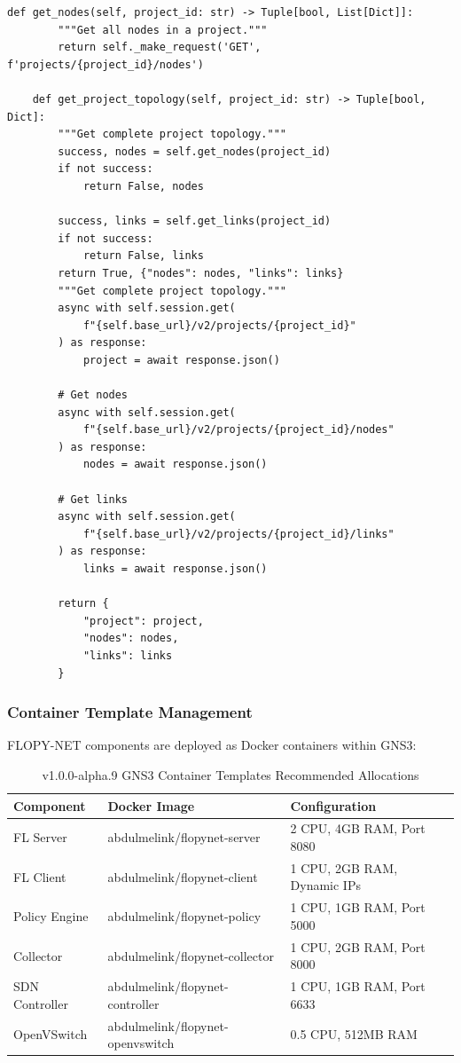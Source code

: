 \begin{lstlisting}[style=pythoncode, caption=GNS3 Integration Client]
    def get_nodes(self, project_id: str) -> Tuple[bool, List[Dict]]:
        """Get all nodes in a project."""
        return self._make_request('GET', f'projects/{project_id}/nodes')
    
    def get_project_topology(self, project_id: str) -> Tuple[bool, Dict]:
        """Get complete project topology."""
        success, nodes = self.get_nodes(project_id)
        if not success:
            return False, nodes
        
        success, links = self.get_links(project_id)
        if not success:
            return False, links        
        return True, {"nodes": nodes, "links": links}
        """Get complete project topology."""
        async with self.session.get(
            f"{self.base_url}/v2/projects/{project_id}"
        ) as response:
            project = await response.json()
        
        # Get nodes
        async with self.session.get(
            f"{self.base_url}/v2/projects/{project_id}/nodes"
        ) as response:
            nodes = await response.json()
        
        # Get links
        async with self.session.get(
            f"{self.base_url}/v2/projects/{project_id}/links"
        ) as response:
            links = await response.json()
        
        return {
            "project": project,
            "nodes": nodes,
            "links": links
        }
\end{lstlisting}

\subsubsection{Container Template Management}

FLOPY-NET components are deployed as Docker containers within GNS3:

\begin{table}[H]
\centering
\caption{v1.0.0-alpha.9 GNS3 Container Templates Recommended Allocations}
\label{tab:gns3-templates}
\begin{tabular}{@{}llp{5cm}@{}}
\toprule
\textbf{Component} & \textbf{Docker Image} & \textbf{Configuration} \\
\midrule
FL Server & abdulmelink/flopynet-server & 2 CPU, 4GB RAM, Port 8080 \\
FL Client & abdulmelink/flopynet-client & 1 CPU, 2GB RAM, Dynamic IPs \\
Policy Engine & abdulmelink/flopynet-policy & 1 CPU, 1GB RAM, Port 5000 \\
Collector & abdulmelink/flopynet-collector & 1 CPU, 2GB RAM, Port 8000 \\
SDN Controller & abdulmelink/flopynet-controller & 1 CPU, 1GB RAM, Port 6633 \\
OpenVSwitch & abdulmelink/flopynet-openvswitch & 0.5 CPU, 512MB RAM \\
\bottomrule
\end{tabular}
\end{table}

